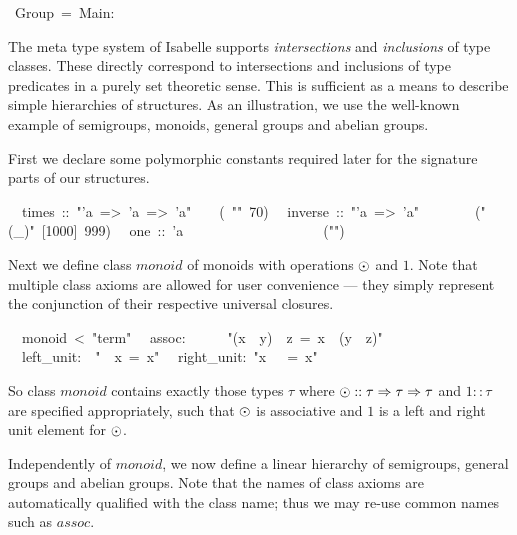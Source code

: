 \begin{isabelle}%
%
~Group~=~Main:%
\begin{isamarkuptext}%
\medskip\noindent The meta type system of Isabelle supports
 \emph{intersections} and \emph{inclusions} of type classes. These
 directly correspond to intersections and inclusions of type
 predicates in a purely set theoretic sense. This is sufficient as a
 means to describe simple hierarchies of structures.  As an
 illustration, we use the well-known example of semigroups, monoids,
 general groups and abelian groups.%
\end{isamarkuptext}%
%
%
\begin{isamarkuptext}%
First we declare some polymorphic constants required later for the
 signature parts of our structures.%
\end{isamarkuptext}%
\isanewline
~~times~::~{"}'a~=>~'a~=>~'a{"}~~~~(~{"}{\isasymOtimes}{"}~70)\isanewline
~~inverse~::~{"}'a~=>~'a{"}~~~~~~~~({"}(\_{\isasyminv}){"}~[1000]~999)\isanewline
~~one~::~'a~~~~~~~~~~~~~~~~~~~~({"}{\isasymunit}{"})%
\begin{isamarkuptext}%
\noindent Next we define class $monoid$ of monoids with operations
 $\odot$ and $1$.  Note that multiple class axioms are allowed for
 user convenience --- they simply represent the conjunction of their
 respective universal closures.%
\end{isamarkuptext}%
\isanewline
~~monoid~<~{"}term{"}\isanewline
~~assoc:~~~~~~{"}(x~{\isasymOtimes}~y)~{\isasymOtimes}~z~=~x~{\isasymOtimes}~(y~{\isasymOtimes}~z){"}\isanewline
~~left\_unit:~~{"}{\isasymunit}~{\isasymOtimes}~x~=~x{"}\isanewline
~~right\_unit:~{"}x~{\isasymOtimes}~{\isasymunit}~=~x{"}%
\begin{isamarkuptext}%
\noindent So class $monoid$ contains exactly those types $\tau$ where
 $\odot :: \tau \Rightarrow \tau \Rightarrow \tau$ and $1 :: \tau$ are specified
 appropriately, such that $\odot$ is associative and $1$ is a left
 and right unit element for $\odot$.%
\end{isamarkuptext}%
%
\begin{isamarkuptext}%
\medskip Independently of $monoid$, we now define a linear hierarchy
 of semigroups, general groups and abelian groups.  Note that the
 names of class axioms are automatically qualified with the class
 name; thus we may re-use common names such as $assoc$.%
\end{isamarkuptext}%

\end{isabelle}
